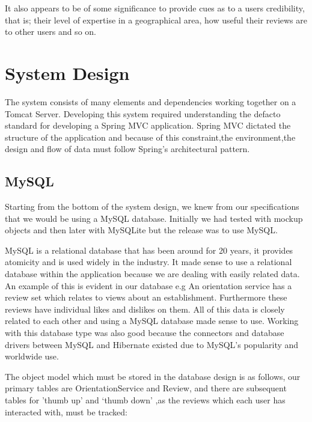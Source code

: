 It also appears to be of some significance to provide cues as to a users credibility, that is; their level of expertise in a geographical area, how useful their reviews are to other users and so on\cite{Lopez}.


\chapter{System Design}

The system consists of many elements and dependencies working together on a Tomcat Server. Developing this system required understanding the defacto standard for developing a Spring MVC application. Spring MVC dictated the structure of the application and because of this constraint,the environment,the design and flow of data must follow Spring's architectural pattern.

\section{MySQL}

Starting from the bottom of the system design, we knew from our specifications that we would be using a MySQL database. Initially we had tested with mockup objects and then later with MySQLite but the release was to use MySQL. \newline 

\noindent MySQL is a relational database that has been around for 20 years, it provides atomicity and is used widely in the industry. It made sense to use a relational database within the application because we are dealing with easily related data. An example of this is evident in our database e.g An orientation service has a review set which relates to views about an establishment. Furthermore these reviews have individual likes and dislikes on them. All of this data is closely related to each other and using a MySQL database made sense to use. Working with this database type was also good because the connectors and database drivers between MySQL and Hibernate existed due to MySQL's popularity and worldwide use. \newline

\noindent The object model which must be stored in the database design is as follows, our primary tables are OrientationService and Review, and there are subsequent tables for 'thumb up' and `thumb down' ,as the reviews which each user has interacted with, must be tracked:

